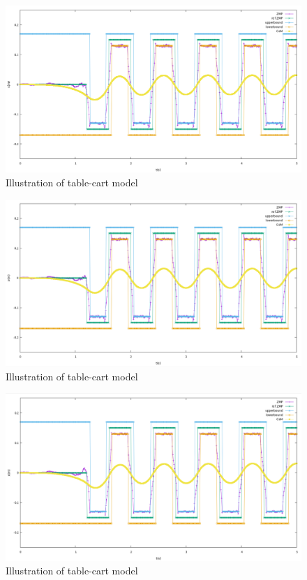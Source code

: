 \begin{figure}[H]
  \centering
 \includegraphics[keepaspectratio, scale=0.25]
      {images/mpc_qr/mpc_qr_10_6.png}
 \caption{Illustration of table-cart model}
 \label{Fig:Illustration of table-cart model}
\end{figure}

\begin{figure}[H]
  \centering
 \includegraphics[keepaspectratio, scale=0.25]
      {images/mpc_qr/mpc_qr_10_7.png}
 \caption{Illustration of table-cart model}
 \label{Fig:Illustration of table-cart model}
\end{figure}

\begin{figure}[H]
  \centering
 \includegraphics[keepaspectratio, scale=0.25]
      {images/mpc_qr/mpc_qr_10_8.png}
 \caption{Illustration of table-cart model}
 \label{Fig:Illustration of table-cart model}
\end{figure}

